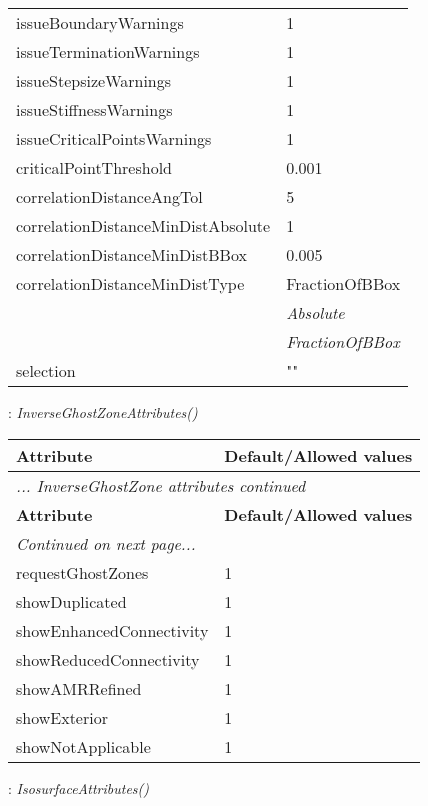 \documentclass[10pt,a4paper]{report}
\begin{document}
\begin{longtable}{ll}
issueBoundaryWarnings  &  1 \\
issueTerminationWarnings  &  1 \\
issueStepsizeWarnings  &  1 \\
issueStiffnessWarnings  &  1 \\
issueCriticalPointsWarnings  &  1 \\
criticalPointThreshold  &  0.001 \\
correlationDistanceAngTol  &  5 \\
correlationDistanceMinDistAbsolute  &  1 \\
correlationDistanceMinDistBBox  &  0.005 \\
correlationDistanceMinDistType  &  FractionOfBBox   \\
 & {\it  Absolute} \\
 & {\it  FractionOfBBox} \\
selection  &  "" \\
\end{longtable}

\newpage

{}
: {\it InverseGhostZoneAttributes() }\\[-3mm]

\begin{longtable}{ll}
{\bf Attribute} & {\bf Default/Allowed values} \\
\hline \hline
\endfirsthead
\multicolumn{2}{l}{{\it ... InverseGhostZone attributes continued}} \\
{\bf Attribute} & {\bf Default/Allowed values} \\
\hline \hline
\endhead
\hline
\multicolumn{2}{l}{{\it Continued on next page...}} \\
\endfoot
\hline
\endlastfoot

requestGhostZones  &  1 \\
showDuplicated  &  1 \\
showEnhancedConnectivity  &  1 \\
showReducedConnectivity  &  1 \\
showAMRRefined  &  1 \\
showExterior  &  1 \\
showNotApplicable  &  1 \\
\end{longtable}

\newpage

{}
: {\it IsosurfaceAttributes() }\\[-3mm]
\end{document}
